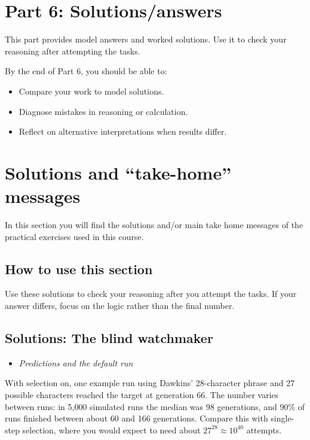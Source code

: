 \documentclass[
  a4paper]{book}
\providecommand{\tightlist}{%
  \setlength{\itemsep}{0pt}\setlength{\parskip}{0pt}}
\begin{document}
\chapter*{Part 6: Solutions/answers}\label{part-6}

This part provides model answers and worked solutions. Use it to check your reasoning after attempting the tasks.

By the end of Part 6, you should be able to:

\begin{itemize}
\tightlist
\item
  Compare your work to model solutions.
\item
  Diagnose mistakes in reasoning or calculation.
\item
  Reflect on alternative interpretations when results differ.
\end{itemize}

\chapter{Solutions and ``take-home'' messages}\label{solutions-and-take-home-messages}

In this section you will find the solutions and/or main take home messages of the practical exercises used in this course.

\section{How to use this section}\label{how-to-use-this-section}

Use these solutions to check your reasoning after you attempt the tasks. If your answer differs, focus on the logic rather than the final number.

\section{Solutions: The blind watchmaker}\label{solutions-the-blind-watchmaker}

\begin{itemize}
\tightlist
\item
  \emph{Predictions and the default run}
\end{itemize}

With selection on, one example run using Dawkins' 28-character phrase and 27 possible characters reached the target at generation 66. The number varies between runs: in 5,000 simulated runs the median was 98 generations, and 90\% of runs finished between about 60 and 166 generations. Compare this with single-step selection, where you would expect to need about \(27^{28} \approx 10^{40}\) attempts.
\end{document}

